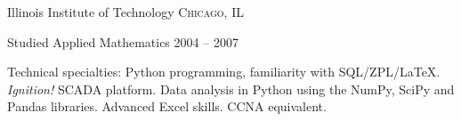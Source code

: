 \documentclass[10pt,a4paper]{article} %
\begin{document}


\spacedhrule{-0.2em}{-0.4em} %



\headedsection %
{Illinois Institute of Technology}
{\textsc{Chicago, IL}} {

\headedsubsection %
{Studied Applied Mathematics}
{2004 -- 2007}
{}}


\spacedhrule{0.5em}{-0.4em} %



\inlineheadsection %
{Technical specialties:}
{Python programming, familiarity with SQL/ZPL/\LaTeX.  \textit{Ignition!} SCADA platform.  Data analysis in Python using the NumPy, SciPy and Pandas libraries. Advanced Excel skills. CCNA equivalent.  }



\end{document}
